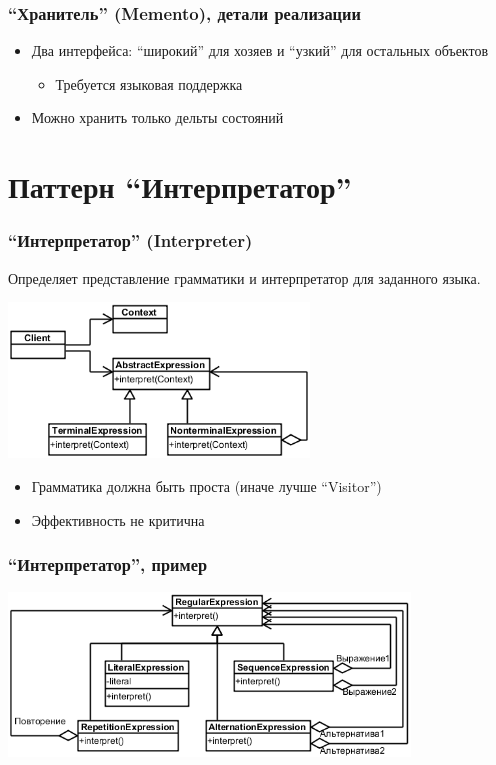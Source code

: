 \documentclass[xetex,mathserif,serif]{beamer}
\begin{document}
	\begin{frame}
		\frametitle{``Хранитель'' (Memento), детали реализации}
		\begin{itemize}
			\item Два интерфейса: ``широкий'' для хозяев и ``узкий'' для остальных объектов
			\begin{itemize}
				\item Требуется языковая поддержка
			\end{itemize}
			\item Можно хранить только дельты состояний
		\end{itemize}
	\end{frame}

	\section{Паттерн ``Интерпретатор''}

	\begin{frame}
		\frametitle{``Интерпретатор'' (Interpreter)}
		Определяет представление грамматики и интерпретатор для заданного языка.
		\begin{center}
			\includegraphics[width=0.6\textwidth]{interpreter.png}
		\end{center}
		\begin{itemize}
			\item Грамматика должна быть проста (иначе лучше ``Visitor'')
			\item Эффективность не критична
		\end{itemize}
	\end{frame}

	\begin{frame}
		\frametitle{``Интерпретатор'', пример}
		\begin{center}
			\includegraphics[width=0.8\textwidth]{regexp.png}
		\end{center}
	\end{frame}
\end{document}
